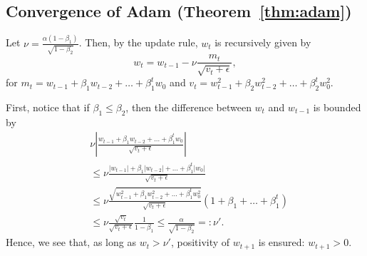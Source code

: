 \documentclass[conference]{IEEEtran}
\begin{document}
\subsection{Convergence of Adam (Theorem~\ref{thm:adam})}

Let $\nu = \frac{\alpha(1-\beta_1)}{\sqrt{1-\beta_2}}$. Then, by the update rule, $w_t$ is recursively given by 
$$
w_t = w_{t-1} - \nu \frac{ m_{t}}{\sqrt{v_t + \epsilon}},
$$
for $m_{t} = w_{t-1} + \beta_1 w_{t-2} + \dots + \beta_{1}^t w_0$ and $v_t =  w_{t-1}^2 + \beta_2 w_{t-2}^2 + \dots + \beta_{2}^t w_0^2$.

First, notice that if $\beta_1 \leq \beta_2$, then 
the difference between $w_t$ and $w_{t-1}$ is bounded by 
\begin{align*}
&	\nu \left| \frac{w_{t-1} + \beta_1 w_{t-2} + \dots + \beta_1^t w_0 }{\sqrt{v_t + \epsilon}} \right| \\
&	\leq \nu  \frac{ |w_{t-1}| + \beta_1 |w_{t-2}| + \dots + \beta_1^t |w_0| }{\sqrt{v_t + \epsilon}}  \\
& \leq \nu  \frac{ \sqrt{ w_{t-1}^2 + \beta_1 w_{t-2}^2 + \dots + \beta_1^{t} w_0^2} }{\sqrt{v_t + \epsilon}} (1+\beta_1 + \dots + \beta_1^{t}) \\
& \leq \nu \frac{\sqrt{v_t}}{\sqrt{v_t + \epsilon}} \frac{1}{1 - \beta_1} \leq \frac{\alpha}{\sqrt{1 - \beta_2}} =: \nu'.
\end{align*}
Hence, we see that, as long as $w_t > \nu'$, positivity of $w_{t+1}$ is ensured: $w_{t+1} > 0$.
\end{document}
